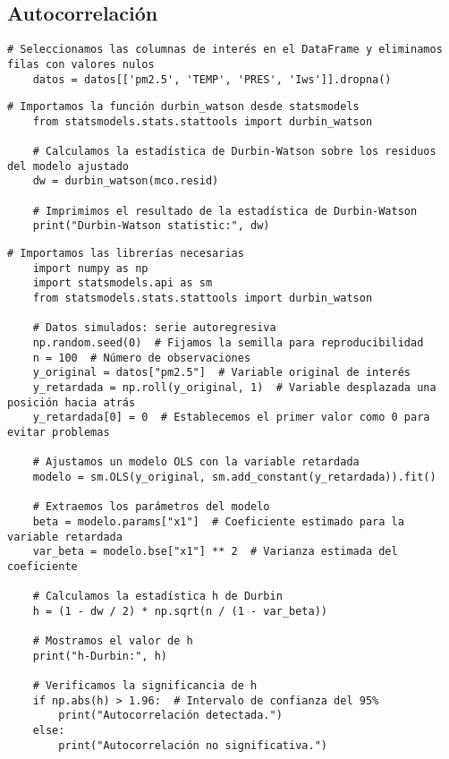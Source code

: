\documentclass[a4paper,12pt]{article}
\begin{document}
\subsection{Autocorrelación}

\begin{lstlisting}[style=custompython, caption=Selección y limpieza de datos en un DataFrame]
    # Seleccionamos las columnas de interés en el DataFrame y eliminamos filas con valores nulos
    datos = datos[['pm2.5', 'TEMP', 'PRES', 'Iws']].dropna()
\end{lstlisting}

\begin{lstlisting}[style=custompython, caption=Cálculo de la estadística de Durbin-Watson para residuos]
    # Importamos la función durbin_watson desde statsmodels
    from statsmodels.stats.stattools import durbin_watson
    
    # Calculamos la estadística de Durbin-Watson sobre los residuos del modelo ajustado
    dw = durbin_watson(mco.resid)
    
    # Imprimimos el resultado de la estadística de Durbin-Watson
    print("Durbin-Watson statistic:", dw)
\end{lstlisting}

\begin{lstlisting}[style=custompython, caption=Detección de autocorrelación con la estadística h de Durbin]
    # Importamos las librerías necesarias
    import numpy as np
    import statsmodels.api as sm
    from statsmodels.stats.stattools import durbin_watson
    
    # Datos simulados: serie autoregresiva
    np.random.seed(0)  # Fijamos la semilla para reproducibilidad
    n = 100  # Número de observaciones
    y_original = datos["pm2.5"]  # Variable original de interés
    y_retardada = np.roll(y_original, 1)  # Variable desplazada una posición hacia atrás
    y_retardada[0] = 0  # Establecemos el primer valor como 0 para evitar problemas
    
    # Ajustamos un modelo OLS con la variable retardada
    modelo = sm.OLS(y_original, sm.add_constant(y_retardada)).fit()
    
    # Extraemos los parámetros del modelo
    beta = modelo.params["x1"]  # Coeficiente estimado para la variable retardada
    var_beta = modelo.bse["x1"] ** 2  # Varianza estimada del coeficiente
    
    # Calculamos la estadística h de Durbin
    h = (1 - dw / 2) * np.sqrt(n / (1 - var_beta))
    
    # Mostramos el valor de h
    print("h-Durbin:", h)
    
    # Verificamos la significancia de h
    if np.abs(h) > 1.96:  # Intervalo de confianza del 95%
        print("Autocorrelación detectada.")
    else:
        print("Autocorrelación no significativa.")
\end{lstlisting}
    
\end{document}
